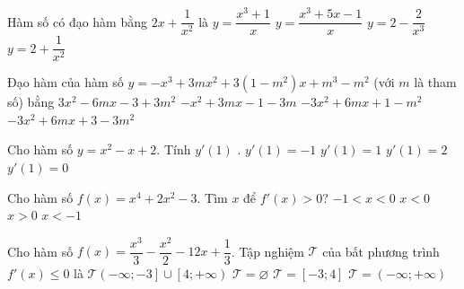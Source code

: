 \begin{ex}%
	Hàm số có đạo hàm  bằng $2x+\dfrac{1}{x^2}$ là
	 \choice
		 {$y=\dfrac{x^3+1}{x}$}
		{\True $y=\dfrac{x^3+5x-1}{x}$} 
		 {$y=2-\dfrac{2}{x^3}$}
		{$y=2+\dfrac{1}{x^2}$} 
\end{ex}

\begin{ex}%
	Đạo hàm của hàm số $y=-x^3+3mx^2+3\left(1-m^2\right)x+m^3-m^2$ (với $m$ là tham số)  bằng
	 \choice
		 {$3x^2-6mx-3+3m^2$}
		{$-x^2+3mx-1-3m$} 
		 {$-3x^2+6mx+1-m^2$}
		{\True $-3x^2+6mx+3-3m^2$} 
\end{ex}

\begin{ex}%
	Cho hàm số $y=x^2-x+2$. Tính $y'(1)$ . 
	\choice 
		{$y'(1)=-1$} 
		{\True $y'(1)=1$} 
		{$y'(1)=2$} 
		 {$ y'(1)=0$}
\end{ex}

\begin{ex}%
	Cho hàm số $f(x)=x^4+2x^2-3$. Tìm $x$  để $f'(x)>0$?
	\choice 
		 {$-1< x <0$}
		 {$x < 0$}
		{\True $x >0$} 
		{$x  <-1$}
\end{ex}

\begin{ex}%
	Cho hàm số  $f(x) = \dfrac{x^3}{3} - \dfrac{x^2}{2} - 12x + \dfrac{1}{3}$. Tập nghiệm $\mathscr{T}$ của bất phương trình $f'(x) \leq 0$ là
	 \choice
		 {$\mathscr{T} \left(- \infty; - 3 \right] \cup \left[4; + \infty \right)$}
		{$\mathscr{T} =  \varnothing$}
		{\True $\mathscr{T} =\left[-3;4 \right]$} 
		{$\mathscr{T}  = \left(- \infty; + \infty \right)$}
\end{ex}

